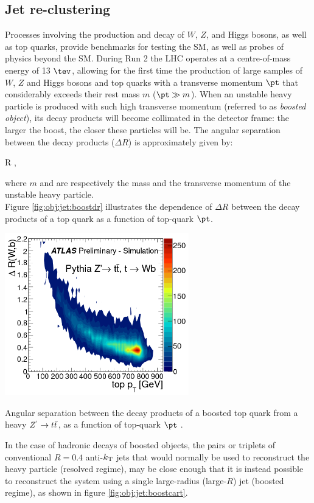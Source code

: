 \subsection{Jet re-clustering}

Processes involving the production and decay of $W$, $Z$, and Higgs bosons, as well as top quarks, provide benchmarks for testing the SM, as well as probes of physics beyond the SM. During Run 2 the  LHC operates at a centre-of-mass energy of 13 $\tev$, allowing for the first time the production of large samples of $W$, $Z$ and Higgs bosons and top quarks with a transverse momentum $\pt$ that considerably exceeds their rest mass $m$ ($\pt\gg m$).  When an unstable heavy particle is produced with such high transverse momentum (referred to as {\sl boosted object}), its decay products will become collimated in the detector frame:  the larger the boost, the closer these particles will be. The angular separation between the decay products ($\Delta R$) is approximately given by:

\be
\Delta R \approx {},
\ee

\noindent where $m$ and \pt are respectively the mass and the transverse momentum of the unstable heavy particle.\\
Figure \ref{fig:obj:jet:boostdr}  illustrates the dependence of $\Delta R$ between the decay products of a top quark as a function of top-quark $\pt$.

\bfig[htb!]
\centering
\includegraphics[width=0.6\textwidth]{figures/Objects/boostdr.png}
\captionsetup{width=0.85\textwidth} \caption{\small Angular separation between the decay products of a boosted top quark from a heavy $Z^{`}\to t\bar{t}$, as a function of top-quark $\pt$ .}
\label{fig:obj:jet:boostdr}
\efig

In the case of hadronic decays of boosted objects, the pairs or triplets of conventional $R=0.4$ anti-$k_{\rm T}$ jets that would normally be used to reconstruct the heavy particle (resolved regime), may be close enough that it is instead possible to reconstruct the system using a single large-radius (large-$R$) jet (boosted regime), as shown in figure \ref{fig:obj:jet:boostcart}.

